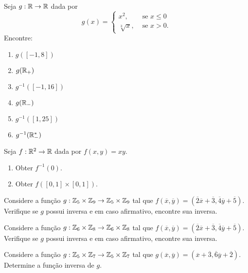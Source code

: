 \documentclass[12pt]{exam}
\begin{document}
\vspace{.3cm}

\questao{} Seja $g : \mathbb{R} \to \mathbb{R}$ dada por
\[
    g(x) = \begin{cases}
        x^2,& \mbox{ se } x \le 0\\
        \sqrt[3]{x}, & \mbox{ se } x > 0.
    \end{cases}
\]
Encontre:
\begin{multicols}{2}
    \begin{enumerate}[label={\alph*})]
        \item $g([-1,8])$
        \item $g(\mathbb{R}_+)$
        \item $g^{-1}([-1,16])$
        \item $g(\mathbb{R}_-)$
        \item $g^{-1}([1,25])$
        \item $g^{-1}(\mathbb{R}^*_-)$
    \end{enumerate} 
\end{multicols}

\vspace{.3cm}

\questao{} Seja $f: \mathbb{R}^2 \to \mathbb{R}$ dada por $f(x,y) = xy$.
\begin{enumerate}[label={\alph*})]
    \item Obter $f^{-1}({0})$.
    \item Obter $f([0,1]\times [0,1])$.
\end{enumerate}

\vspace{.3cm}


\questao{} Considere a fun{\c c}{\~a}o $g : \mathbb{Z}_5 \times \mathbb{Z}_9 \to \mathbb{Z}_5 \times \mathbb{Z}_9$ tal que $f(\overline{x},\overline{y}) = (\overline{2} \overline{x} + \overline{3}, \overline{4}\overline{y} + \overline{5})$. Verifique se $g$ possui inversa e em caso afirmativo, encontre sua inversa.

\vspace{.3cm}

\questao{} Considere a fun{\c c}{\~a}o $g : \mathbb{Z}_6 \times \mathbb{Z}_8 \to \mathbb{Z}_6 \times \mathbb{Z}_8$ tal que $f(\overline{x},\overline{y}) = (\overline{2} \overline{x} + \overline{3}, \overline{4}\overline{y} + \overline{5})$. Verifique se $g$ possui inversa e em caso afirmativo, encontre sua inversa.

\vspace{.3cm}

\questao{} Considere a fun{\c c}{\~a}o $g : \mathbb{Z}_5 \times \mathbb{Z}_7 \to \mathbb{Z}_5 \times \mathbb{Z}_7$ tal que $g(\overline{x},\overline{y}) = (\overline{x} + \overline{3}, \overline{6}\overline{y} + \overline{2})$. Determine a fun\c{c}\~ao inversa de $g$.
\end{document}

